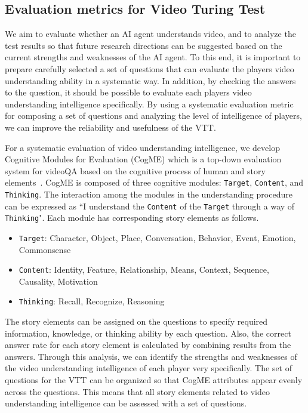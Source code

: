 \documentclass[letterpaper]{article} %
\begin{document}
\subsection{Evaluation metrics for Video Turing Test}
We aim to evaluate whether an AI agent understands video, and to analyze the test results so that future research directions can be suggested based on the current strengths and weaknesses of the AI agent. 
To this end, it is important to prepare carefully selected a set of questions that can evaluate the players video understanding ability in a systematic way. 
In addition, by checking the answers to the question, it should be possible to evaluate each players video understanding intelligence specifically. 
By using a systematic evaluation metric for composing a set of questions and analyzing the level of intelligence of players, we can improve the reliability and usefulness of the VTT.

For a systematic evaluation of video understanding intelligence, we develop Cognitive Modules for Evaluation (CogME) which is a top-down evaluation system for videoQA based on the cognitive process of human and story elements~\cite{shin2021cogme}.
CogME is composed of three cognitive modules: \texttt{Target}, \texttt{Content}, and \texttt{Thinking}. The interaction among the modules in the understanding procedure can be expressed as ``I understand the \texttt{Content} of the \texttt{Target} through a way of \texttt{Thinking}". Each module has corresponding story elements as follows.

\begin{itemize}
    \item \texttt{Target}: Character, Object, Place, Conversation, Behavior, Event, Emotion, Commonsense
    \item \texttt{Content}: Identity, Feature, Relationship, Means, Context, Sequence, Causality, Motivation
    \item \texttt{Thinking}: Recall, Recognize, Reasoning
\end{itemize}

The story elements can be assigned on the questions to specify required information, knowledge, or thinking ability by each question. Also, the correct answer rate for each story element is calculated by combining results from the answers. Through this analysis, we can identify the strengths and weaknesses of the video understanding intelligence of each player very specifically.
The set of questions for the VTT can be organized so that CogME attributes appear evenly across the questions. This means that all story elements related to video understanding intelligence can be assessed with a set of questions.
\end{document}
